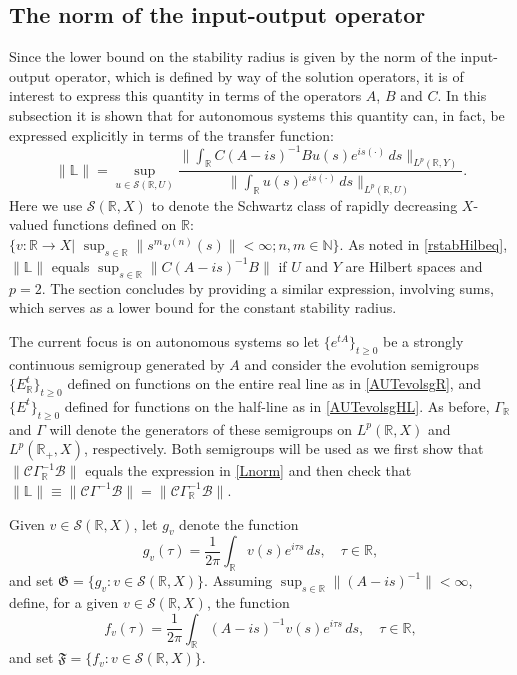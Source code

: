 \documentclass[10pt,psamsfonts,leqno]{siamltex}
\newcommand{\bbR}{\mathbb{R}}
\newcommand{\bbL}{\mathbb{L}}
\newcommand{\calB}{\mathcal{B}}
\newcommand{\calC}{\mathcal{C}}
\newcommand{\calS}{\mathcal{S}}
\newcommand{\scrG}{\mathfrak{G}}
\newcommand{\scrF}{\mathfrak{F}}
\newcommand{\lb}{\label}
\begin{document}
\subsection{The norm of the input-output
operator}\label{normLsubsection}

Since the lower bound on the stability radius is given by the norm of
the
input-output operator, which is defined by way of the solution
operators, it is of interest to express this quantity in terms of the
operators $A$, $B$ and $C$.  In this subsection it is shown that
for autonomous systems this
quantity can, in fact, be expressed explicitly in terms of the transfer
function:
\begin{equation}\lb{Lnorm}
\| \bbL \| = \sup_{u\in \calS(\bbR, U)}
\frac{\|\int_\bbR C(A-is)^{-1}Bu(s)e^{is(\cdot)}\,ds
\|_{L^p(\bbR,Y)}} {\|\int_\bbR u(s)e^{is(\cdot)}\,ds\|_{L^p(\bbR,U)}}.
\end{equation}
Here we use $\calS(\bbR, X)$ to denote the Schwartz class of
rapidly decreasing $X$-valued functions defined on $\bbR$: \
$\{v:{\mathbb R}\to X\big|\,\,\sup_{s\in{\mathbb
R}}\|s^mv^{(n)}(s)\|<\infty; n, m\in{\mathbb N}\}$.  As noted in
\eqref{rstabHilbeq}, $\|\bbL\|$ equals
$\sup_{s\in\bbR}\|C(A-is)^{-1}B\|$ if $U$ and $Y$ are Hilbert spaces and
$p=2$.
The section concludes by providing a similar expression, involving sums,
which serves as a lower bound for the constant stability radius.

The current focus is on autonomous systems so let $\{e^{tA}\}_{t\ge0}$
be a strongly continuous semigroup generated by $A$ and consider the
evolution semigroups $\{E^t_\bbR\}_{t\ge0}$ defined on functions on
the entire real line as
in \eqref{AUTevolsgR}, and $\{E^t\}_{t\ge0}$ defined for functions on
the
half-line as in \eqref{AUTevolsgHL}.  As before,  $\Gamma_\bbR$ and
$\Gamma$ will denote the generators of these semigroups on $L^p(\bbR,X)$
and $L^p(\bbR_+,X)$, respectively.  Both semigroups will be used as we
first show that $\|\calC\Gamma_\bbR^{-1}\calB\|$ equals the expression
in
\eqref{Lnorm} and then check that
$\|\bbL\|\equiv\|\calC\Gamma^{-1}\calB\|
=\|\calC\Gamma_\bbR^{-1}\calB\|$.

Given $v\in \calS(\bbR,X)$, let $g_v$  denote the function
$$
g_v(\tau)=\frac{1}{2\pi}\int_\bbR v(s) e^{i\tau s}\, ds,
\quad\tau\in{\mathbb R},
$$
and set $\scrG = \{g_v: v\in \calS(\bbR,X)\}.$
Assuming $\sup_{s\in\bbR}\|(A-is)^{-1}\|<\infty$,
define, for a given $v\in
\calS(\bbR,X)$, the function
$$f_v(\tau)=\frac{1}{2\pi}\int_\bbR (A-is)^{-1}v(s) e^{i\tau s}\, ds,
\quad\tau\in{\mathbb R},$$
and set $\scrF = \{f_v: v\in \calS(\bbR,X)\}$.
\end{document}
